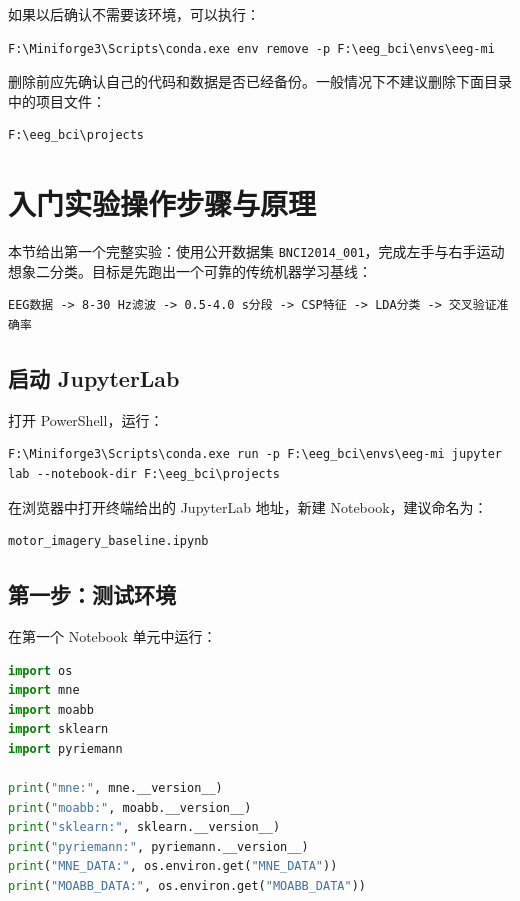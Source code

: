 \documentclass[UTF8,a4paper,12pt]{ctexart}
\begin{document}
如果以后确认不需要该环境，可以执行：

\begin{lstlisting}[language={},caption={删除 eeg-mi 环境}]
F:\Miniforge3\Scripts\conda.exe env remove -p F:\eeg_bci\envs\eeg-mi
\end{lstlisting}

删除前应先确认自己的代码和数据是否已经备份。一般情况下不建议删除下面目录中的项目文件：

\begin{lstlisting}[language={}]
F:\eeg_bci\projects
\end{lstlisting}

\section{入门实验操作步骤与原理}

本节给出第一个完整实验：使用公开数据集 \texttt{BNCI2014\_001}，完成左手与右手运动想象二分类。目标是先跑出一个可靠的传统机器学习基线：

\begin{lstlisting}[language={}]
EEG数据 -> 8-30 Hz滤波 -> 0.5-4.0 s分段 -> CSP特征 -> LDA分类 -> 交叉验证准确率
\end{lstlisting}

\subsection{启动 JupyterLab}

打开 PowerShell，运行：

\begin{lstlisting}[language={},caption={启动入门实验 Notebook}]
F:\Miniforge3\Scripts\conda.exe run -p F:\eeg_bci\envs\eeg-mi jupyter lab --notebook-dir F:\eeg_bci\projects
\end{lstlisting}

在浏览器中打开终端给出的 JupyterLab 地址，新建 Notebook，建议命名为：

\begin{lstlisting}[language={}]
motor_imagery_baseline.ipynb
\end{lstlisting}

\subsection{第一步：测试环境}

在第一个 Notebook 单元中运行：

\begin{lstlisting}[language=Python,caption={测试脑电实验环境}]
import os
import mne
import moabb
import sklearn
import pyriemann

print("mne:", mne.__version__)
print("moabb:", moabb.__version__)
print("sklearn:", sklearn.__version__)
print("pyriemann:", pyriemann.__version__)
print("MNE_DATA:", os.environ.get("MNE_DATA"))
print("MOABB_DATA:", os.environ.get("MOABB_DATA"))
\end{lstlisting}
\end{document}

